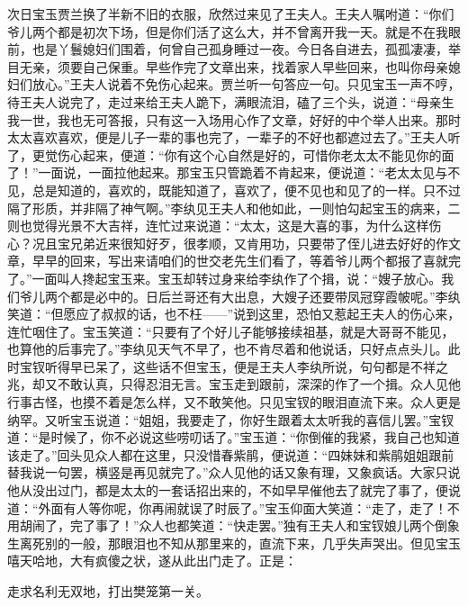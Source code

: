 \begin{parag}
    次日宝玉贾兰换了半新不旧的衣服，欣然过来见了王夫人。王夫人嘱咐道：“你们爷儿两个都是初次下场，但是你们活了这么大，并不曾离开我一天。就是不在我眼前，也是丫鬟媳妇们围着，何曾自己孤身睡过一夜。今日各自进去，孤孤凄凄，举目无亲，须要自己保重。早些作完了文章出来，找着家人早些回来，也叫你母亲媳妇们放心。”王夫人说着不免伤心起来。贾兰听一句答应一句。只见宝玉一声不哼，待王夫人说完了，走过来给王夫人跪下，满眼流泪，磕了三个头，说道：“母亲生我一世，我也无可答报，只有这一入场用心作了文章，好好的中个举人出来。那时太太喜欢喜欢，便是儿子一辈的事也完了，一辈子的不好也都遮过去了。”王夫人听了，更觉伤心起来，便道：“你有这个心自然是好的，可惜你老太太不能见你的面了！”一面说，一面拉他起来。那宝玉只管跪着不肯起来，便说道：“老太太见与不见，总是知道的，喜欢的，既能知道了，喜欢了，便不见也和见了的一样。只不过隔了形质，并非隔了神气啊。”李纨见王夫人和他如此，一则怕勾起宝玉的病来，二则也觉得光景不大吉祥，连忙过来说道：“太太，这是大喜的事，为什么这样伤心？况且宝兄弟近来很知好歹，很孝顺，又肯用功，只要带了侄儿进去好好的作文章，早早的回来，写出来请咱们的世交老先生们看了，等着爷儿两个都报了喜就完了。”一面叫人搀起宝玉来。宝玉却转过身来给李纨作了个揖，说：“嫂子放心。我们爷儿两个都是必中的。日后兰哥还有大出息，大嫂子还要带凤冠穿霞帔呢。”李纨笑道：“但愿应了叔叔的话，也不枉——”说到这里，恐怕又惹起王夫人的伤心来，连忙咽住了。宝玉笑道：“只要有了个好儿子能够接续祖基，就是大哥哥不能见，也算他的后事完了。”李纨见天气不早了，也不肯尽着和他说话，只好点点头儿。此时宝钗听得早已呆了，这些话不但宝玉，便是王夫人李纨所说，句句都是不祥之兆，却又不敢认真，只得忍泪无言。宝玉走到跟前，深深的作了一个揖。众人见他行事古怪，也摸不着是怎么样，又不敢笑他。只见宝钗的眼泪直流下来。众人更是纳罕。又听宝玉说道：“姐姐，我要走了，你好生跟着太太听我的喜信儿罢。”宝钗道：“是时候了，你不必说这些唠叨话了。”宝玉道：“你倒催的我紧，我自己也知道该走了。”回头见众人都在这里，只没惜春紫鹃，便说道：“四妹妹和紫鹃姐姐跟前替我说一句罢，横竖是再见就完了。”众人见他的话又象有理，又象疯话。大家只说他从没出过门，都是太太的一套话招出来的，不如早早催他去了就完了事了，便说道：“外面有人等你呢，你再闹就误了时辰了。”宝玉仰面大笑道：“走了，走了！不用胡闹了，完了事了！”众人也都笑道：“快走罢。”独有王夫人和宝钗娘儿两个倒象生离死别的一般，那眼泪也不知从那里来的，直流下来，几乎失声哭出。但见宝玉嘻天哈地，大有疯傻之状，遂从此出门走了。正是：
\end{parag}


\begin{poem}
    \begin{pl}
        走求名利无双地，打出樊笼第一关。
    \end{pl}
\end{poem}


